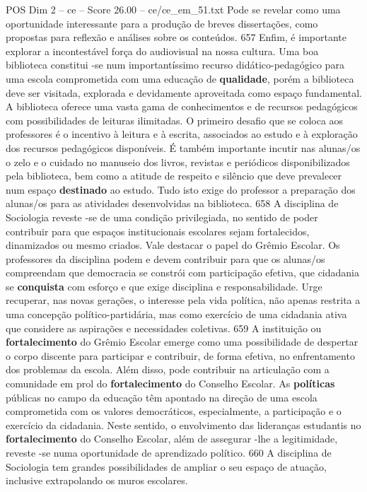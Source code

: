 \begin{textsample}{POS Dim 2 – ce – Score 26.00 – ce/ce\_em\_51.txt}
Pode se revelar como uma oportunidade interessante para a produção de breves dissertações, como propostas para reflexão e análises sobre os conteúdos. 657 Enfim, é importante explorar a incontestável força do audiovisual na nossa cultura.
Uma boa biblioteca constitui -se num importantíssimo recurso didático-pedagógico para uma escola comprometida com uma educação de \textbf{qualidade}, porém a biblioteca deve ser visitada, explorada e devidamente aproveitada como espaço fundamental.
A biblioteca oferece uma vasta gama de conhecimentos e de recursos pedagógicos com possibilidades de leituras ilimitadas.
O primeiro desafio que se coloca aos professores é o incentivo à leitura e à escrita, associados ao estudo e à exploração dos recursos pedagógicos disponíveis.
É também importante incutir nas alunas/os o zelo e o cuidado no manuseio dos livros, revistas e periódicos disponibilizados pela biblioteca, bem como a atitude de respeito e silêncio que deve prevalecer num espaço \textbf{destinado} ao estudo.
Tudo isto exige do professor a preparação dos alunas/os para as atividades desenvolvidas na biblioteca. 658 A disciplina de Sociologia reveste -se de uma condição privilegiada, no sentido de poder contribuir para que espaços institucionais escolares sejam fortalecidos, dinamizados ou mesmo criados.
Vale destacar o papel do Grêmio Escolar.
Os professores da disciplina podem e devem contribuir para que os alunas/os compreendam que democracia se constrói com participação efetiva, que cidadania se \textbf{conquista} com esforço e que exige disciplina e responsabilidade.
Urge recuperar, nas novas gerações, o interesse pela vida política, não apenas restrita a uma concepção político-partidária, mas como exercício de uma cidadania ativa que considere as aspirações e necessidades coletivas. 659 A instituição ou \textbf{fortalecimento} do Grêmio Escolar emerge como uma possibilidade de despertar o corpo discente para participar e contribuir, de forma efetiva, no enfrentamento dos problemas da escola.
Além disso, pode contribuir na articulação com a comunidade em prol do \textbf{fortalecimento} do Conselho Escolar.
As \textbf{políticas} públicas no campo da educação têm apontado na direção de uma escola comprometida com os valores democráticos, especialmente, a participação e o exercício da cidadania.
Neste sentido, o envolvimento das lideranças estudantis no \textbf{fortalecimento} do Conselho Escolar, além de assegurar -lhe a legitimidade, reveste -se numa oportunidade de aprendizado político. 660 A disciplina de Sociologia tem grandes possibilidades de ampliar o seu espaço de atuação, inclusive extrapolando os muros escolares.

\end{textsample}
